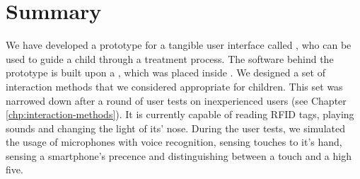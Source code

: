 \section{Summary}
\label{sec:asthmabuddysummary}
We have developed a prototype for a tangible user interface called \ab{}, who can be used to guide a child through a treatment process. The software behind the prototype is built upon a \rpi{}, which was placed inside \ab{}. We designed a set of interaction methods that we considered appropriate for children. This set was narrowed down after a round of user tests on inexperienced users (see Chapter \ref{chp:interaction-methods}). It is currently capable of reading RFID tags, playing sounds and changing the light of its' nose. During the user tests, we simulated the usage of microphones with voice recognition, sensing touches to it's hand, sensing a smartphone's precence and distinguishing between a touch and a high five.       
